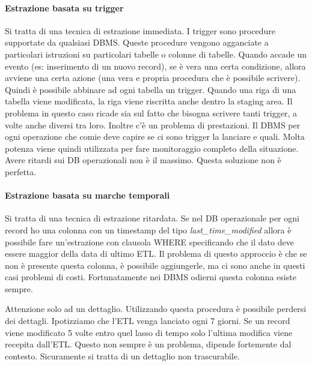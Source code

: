 \paragraph{Estrazione basata su trigger}
Si tratta di una tecnica di estrazione immediata. I trigger sono procedure supportate da qualsiasi DBMS. Queste procedure vengono agganciate a particolari istruzioni su particolari tabelle o colonne di tabelle. Quando accade un evento (es: inserimento di un nuovo record), se è vera una certa condizione, allora avviene una certa azione (una vera e propria procedura che è possibile scrivere).
\noindent Quindi è possibile abbinare ad ogni tabella un trigger. Quando una riga di una tabella viene modificata, la riga viene riscritta anche dentro la staging area. Il problema in questo caso ricade sia sul fatto che bisogna scrivere tanti trigger, a volte anche diversi tra loro. Inoltre c'è un problema di prestazioni. Il DBMS per ogni operazione che comie deve capire se ci sono trigger la lanciare e quali. Molta potenza viene quindi utilizzata per fare monitoraggio completo della situazione. Avere ritardi sui DB operazionali non è il massimo. Questa soluzione non è perfetta.

\paragraph{Estrazione basata su marche temporali}
Si tratta di una tecnica di estrazione ritardata. Se nel DB operazionale per ogni record ho una colonna con un timestamp del tipo \textit{last\_time\_modified} allora è possibile fare un'estrazione con clausola WHERE specificando che il dato deve essere maggior della data di ultimo ETL. Il problema di questo approccio è che se non è presente questa colonna, è possibile aggiungerle, ma ci sono anche in questi casi problemi di costi. Fortunatamente nei DBMS odierni questa colonna esiste sempre.
\begin{warn}
	Attenzione solo ad un dettaglio. Utilizzando questa procedura è possibile perdersi dei dettagli. Ipotizziamo che l'ETL venga lanciato ogni 7 giorni. Se un record viene modificato 5 volte entro quel lasso di tempo solo l'ultima modifica viene recepita dall'ETL. Questo non sempre è un problema, dipende fortemente dal contesto. Sicuramente si tratta di un dettaglio non trascurabile.
\end{warn}

